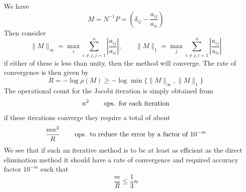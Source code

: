 \documentclass[../main.tex]{subfiles}
\begin{document}
We have
\begin{equation*}
	M = N^{-1} P = \left(\delta_{ij} - \frac{a_{ij}}{a_{ii}} \right)
\end{equation*}
Then consider
\begin{equation*}
	\| M \|_{\infty} = \max_i \sum_{i \neq j, j= 1}^n \left| \frac{a_{ij}}{a_{ii}} \right|, \qquad \| M \|_1 = \max_j \sum_{i \neq j, i= 1}^n \left| \frac{a_{ij}}{a_{ii}} \right|
\end{equation*}
if either of these is less than unity, then the method will converge. The rate of convergence is then given by
\begin{equation*}
	R = - \log \rho(M) \geq - \log \min \{ \| M \|_{\infty}, \| M \|_1 \}
\end{equation*}
The operational count for the Jacobi iteration is simply obtained from
\begin{equation*}
	n^2 \qquad \operatorname{ops.} \text{ for each iteration}
\end{equation*}
if these iterations converge they require a total of about
\begin{equation*}
	\frac{m n^2}{R} \qquad \operatorname{ops.} \text{ to reduce the error by a factor of $10^{-m}$}
\end{equation*}
We see that if such an iterative method is to be at least as efficient as the direct elimination method it should have a rate of convergence and required accuracy factor $10^{-m}$ such that
\begin{equation*}
	\frac{m}{R} \leq \frac{1}{3} n
\end{equation*}
\end{document}
